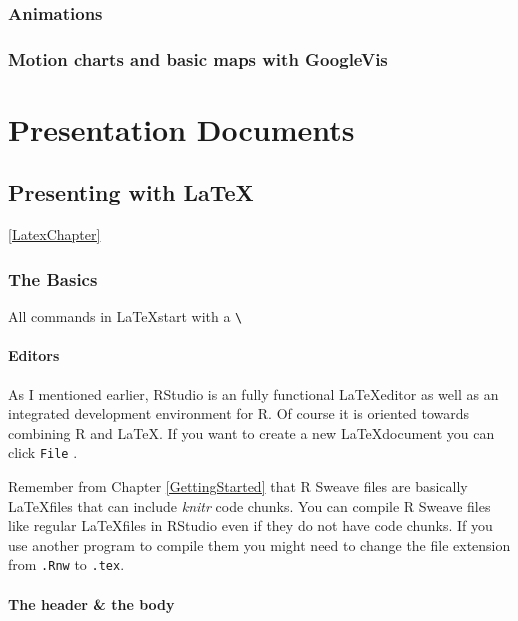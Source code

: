 \documentclass[ChapterTOCs,krantz1]{krantz}\usepackage{graphicx, color}
\begin{document}
{{\section{Animations}

\section{Motion charts and basic maps with GoogleVis}


\part{Presentation Documents}





\chapter{Presenting with \LaTeX}\ref{LatexChapter}

\section{The Basics}

All commands in \LaTeX start with a \texttt{\textbackslash{}}

\subsection{Editors}

As I mentioned earlier, RStudio is an fully functional \LaTeX editor as well as an integrated development environment for R. Of course it is oriented towards combining R and \LaTeX. If you want to create a new \LaTeX document you can click {\tt{File}}  . 

Remember from Chapter \ref{GettingStarted} that R Sweave files are basically \LaTeX files that can include {\emph{knitr}} code chunks. You can compile R Sweave files like regular \LaTeX files in RStudio even if they do not have code chunks. If you use another program to compile them you might need to change the file extension from {\tt{.Rnw}} to {\tt{.tex}}.

\subsection{The header \& the body}

}}
\end{document}
